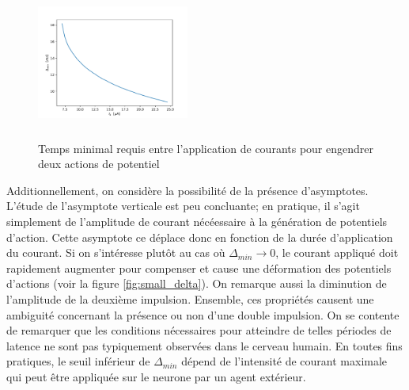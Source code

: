 \documentclass{article}
\begin{document}
\begin{figure}[H]
	\includegraphics[width=5cm, height=5cm]{DeltaMinCurrent.pdf}
	\centering
	\caption{Temps minimal requis entre l'application de courants pour engendrer deux actions de potentiel}
	\label{fig:min_delta}
\end{figure}

Additionnellement, on considère la possibilité de la présence d'asymptotes. L'étude de l'asymptote verticale est peu concluante; en pratique, il s'agit simplement de l'amplitude de courant nécéessaire à la génération de potentiels d'action. Cette asymptote ce déplace donc en fonction de la durée d'application du courant. Si on s'intéresse plutôt au cas où $\Delta_{min} \rightarrow 0$, le courant appliqué doit rapidement augmenter pour compenser et cause une déformation des potentiels d'actions (voir la figure \ref{fig:small_delta}). On remarque aussi la diminution de l'amplitude de la deuxième impulsion. Ensemble, ces propriétés causent une ambiguité concernant la présence ou non d'une double impulsion. On se contente de remarquer que les conditions nécessaires pour atteindre de telles périodes de latence ne sont pas typiquement observées dans le cerveau humain. En toutes fins pratiques, le seuil inférieur de $\Delta_{min}$ dépend de l'intensité de courant maximale qui peut être appliquée sur le neurone par un agent extérieur.
\end{document}
